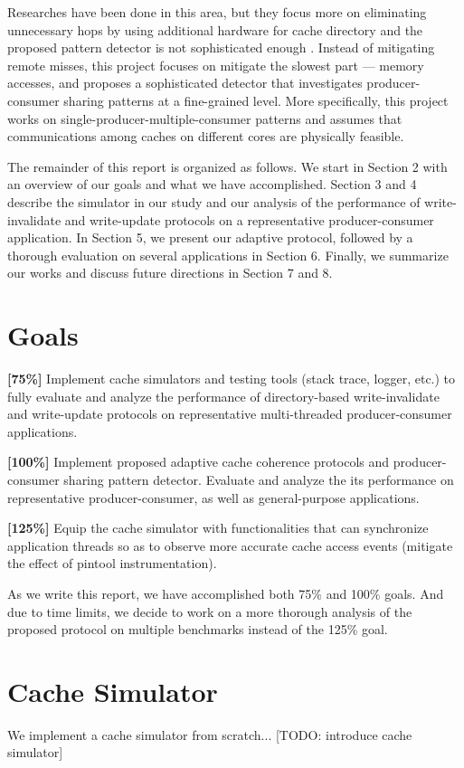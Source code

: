 \documentclass[conference]{IEEEtran}
\begin{document}
Researches have been done in this area, but they focus more on eliminating unnecessary hops by using additional hardware for cache directory and the proposed pattern detector is not sophisticated enough \cite{work1}. Instead of mitigating remote misses, this project focuses on mitigate the slowest part --- memory accesses, and proposes a sophisticated detector that investigates producer-consumer sharing patterns at a fine-grained level. More specifically, this project works on single-producer-multiple-consumer patterns and assumes that communications among caches on different cores are physically feasible.

The remainder of this report is organized as follows. We start in Section 2 with an overview of our goals and what we have accomplished. Section 3 and 4 describe the simulator in our study and our analysis of the performance of write-invalidate and write-update protocols on a representative producer-consumer application. In Section 5, we present our adaptive protocol, followed by a thorough evaluation on several applications in Section 6. Finally, we summarize our works and discuss future directions in Section 7 and 8.


\section{Goals}

\textbf{[75\%]} Implement cache simulators and testing tools (stack trace, logger, etc.) to fully evaluate and analyze the performance of directory-based write-invalidate and write-update protocols on representative multi-threaded producer-consumer applications.

\textbf{[100\%]} Implement proposed adaptive cache coherence protocols and producer-consumer sharing pattern detector. Evaluate and analyze the its performance on representative producer-consumer, as well as general-purpose applications.

\textbf{[125\%]} Equip the cache simulator with functionalities that can synchronize application threads so as to observe more accurate cache access events (mitigate the effect of pintool instrumentation).

As we write this report, we have accomplished both 75\% and 100\% goals. And due to time limits, we decide to work on a more thorough analysis of the proposed protocol on multiple benchmarks instead of the 125\% goal.


\section{Cache Simulator}
We implement a cache simulator from scratch... [TODO: introduce cache simulator]
\end{document}
